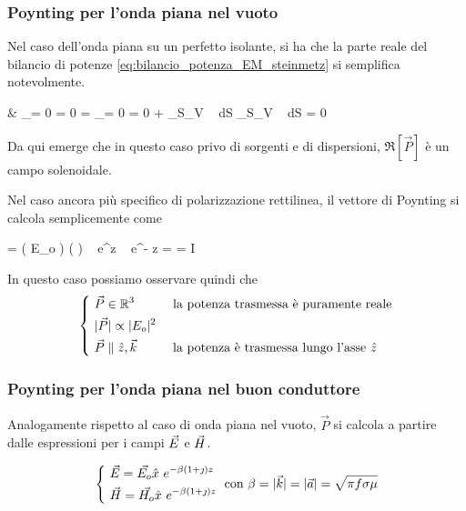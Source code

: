 	\subsubsection{Poynting per l'onda piana nel vuoto}

		Nel caso dell'onda piana su un perfetto isolante, si ha che la parte reale del bilancio di potenze \ref{eq:bilancio_potenza_EM_steinmetz} si semplifica notevolmente.

		\begin{esp}
			& _{= 0  \jt = 0}
				= _{= 0  \sigma = 0}
				+ \int_{S_V} \Re[\vec{P}] \cdot {} ~ dS
				\implies \int_{S_V} \Re[\vec{P}] \cdot {} ~ dS = 0
		\end{esp}

		Da qui emerge che in questo caso privo di sorgenti e di dispersioni, $\Re[\vec{P}]$ è un campo solenoidale.

		Nel caso ancora più specifico di polarizzazione rettilinea, il vettore di Poynting si calcola semplicemente come
		\begin{esp}
			\vec{P}
				=  \left( E_o  \right) \times \left(  \hat{y} \right)
					~ e^{\jmath \beta z} ~ e^{- \jmath \beta z}
				= \frac{|E_o|^2}{2\eta} \hat{z}
				= I \hat{z}
		\end{esp}

		In questo caso possiamo osservare quindi che
		\begin{equation}
			\begin{dcases}
				~  \in \mathbb{R}^3 & \text{ la potenza trasmessa è puramente reale} \\
				~ |\vec{P}| \propto |E_o|^2 \\
				~ \vec{P} \parallel \hat{z}, \k & \text{ la potenza è trasmessa lungo l'asse } \hat{z}
			\end{dcases}
		\end{equation}

	\subsubsection{Poynting per l'onda piana nel buon conduttore}
		Analogamente rispetto al caso di onda piana nel vuoto, $\vec{P}$ si calcola a partire dalle espressioni per i campi $\vec{E}$ e $\vec{H}$.

		\begin{equation}
			\begin{dcases}
				~ \vec{E} = \vec{E_o} \hat{x} ~ e^{-\beta(1+\jmath) z} \\
				~ \vec{H} = \vec{H_o} \hat{x} ~ e^{-\beta(1+\jmath) z} \\
			\end{dcases}
			\text{ con } \beta = |\vec{k}| = |\vec{a}| = \sqrt{\pi f \sigma \mu}
		\end{equation}

